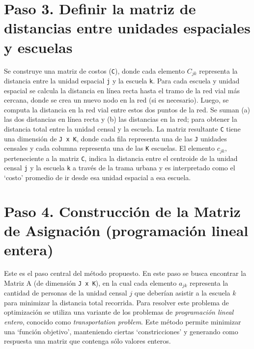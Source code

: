 \documentclass[
  spanish,
  a4paper,%
  chapterprefix=true,%
  DIV=calc,%
  twoside]{scrbook}%
\newcommand{\passthrough}[1]{#1}
\begin{document}
\section*{Paso 3. Definir la matriz de distancias entre unidades espaciales y escuelas}\label{paso-3.-definir-la-matriz-de-distancias-entre-unidades-espaciales-y-escuelas}

Se construye una matriz de costos (\passthrough{\lstinline!C!}), donde cada elemento \(C_{jk}\) representa la distancia entre la unidad espacial \passthrough{\lstinline!j!} y la escuela \passthrough{\lstinline!k!}. Para cada escuela y unidad espacial se calcula la distancia en línea recta hasta el tramo de la red vial más cercana, donde se crea un nuevo nodo en la red (si es necesario). Luego, se computa la distancia en la red vial entre estos dos puntos de la red. Se suman (a) las dos distancias en línea recta y (b) las distancias en la red; para obtener la distancia total entre la unidad censal y la escuela. La matriz resultante \passthrough{\lstinline!C!} tiene una dimensión de \passthrough{\lstinline!J x K!}, donde cada fila representa una de las \passthrough{\lstinline!J!} unidades censales y cada columna representa una de las \passthrough{\lstinline!K!} escuelas. El elemento \(c_{jk}\), perteneciente a la matriz \passthrough{\lstinline!C!}, indica la distancia entre el centroide de la unidad censal \passthrough{\lstinline!j!} y la escuela \passthrough{\lstinline!k!} a través de la trama urbana y es interpretado como el `costo' promedio de ir desde esa unidad espacial a esa escuela.

\section*{Paso 4. Construcción de la Matriz de Asignación (programación lineal entera)}\label{paso-4.-construcciuxf3n-de-la-matriz-de-asignaciuxf3n-programaciuxf3n-lineal-entera}

Este es el paso central del método propuesto. En este paso se busca encontrar la Matriz A (de dimensión \passthrough{\lstinline!J x K!}), en la cual cada elemento \(a_{jk}\) representa la cantidad de personas de la unidad censal \(j\) que deberían asistir a la escuela \(k\) para minimizar la distancia total recorrida. Para resolver este problema de optimización se utiliza una variante de los problemas de \emph{programación lineal entero}, conocido como \emph{transportation problem}. Este método permite minimizar una `función objetivo', manteniendo ciertas `constricciones' y generando como respuesta una matriz que contenga sólo valores enteros.
\end{document}
